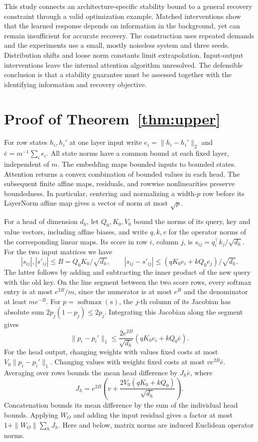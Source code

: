 \documentclass{article}
\DeclareMathOperator{\softmax}{softmax}
\newcommand{\norm}[1]{\lVert #1\rVert_2}
\begin{document}
This study connects an architecture-specific stability bound to a
general recovery constraint through a valid optimization example.
Matched interventions show that the learned response depends on
information in the background, yet can remain insufficient for
accurate recovery. The construction uses repeated demands and the
experiments use a small, mostly noiseless system and three seeds.
Distribution shifts and loose norm constants limit extrapolation.
Input-output interventions leave the internal attention algorithm
unresolved. The defensible conclusion is that a stability guarantee
must be assessed together with the identifying information and
recovery objective.

\clearpage


\clearpage
\appendix
\onecolumn

\section{Proof of Theorem~\ref{thm:upper}}
\label{app:encoder}
For row states \(h_i,h_i'\) at one layer input write
\(e_i=\norm{h_i-h_i'}\) and \(\bar e=m^{-1}\sum_i e_i\).
All state norms have a common bound at each fixed layer, independent
of \(m\). The embedding maps bounded inputs to bounded states.
Attention returns a convex combination of bounded values in each
head. The subsequent finite affine maps, residuals, and rowwise
nonlinearities preserve boundedness. In particular, centering and
normalizing a width-\(p\) row before its LayerNorm affine map gives
a vector of norm at most \(\sqrt p\).

For a head of dimension \(d_h\), let \(Q_0,K_0,V_0\) bound the norms
of its query, key and value vectors, including affine biases, and
write \(q,k,v\) for the operator norms of the corresponding linear
maps. Its score in row \(i\), column \(j\), is
\(s_{ij}=q_i^\top k_j/\sqrt{d_h}\). For the two input matrices we have
\[
 |s_{ij}|,|s'_{ij}|\le B=Q_0K_0/\sqrt{d_h},
 \qquad |s_{ij}-s'_{ij}|\le
 (qK_0e_i+kQ_0e_j)/\sqrt{d_h}.
\]
The latter follows by adding and subtracting the inner product of
the new query with the old key. On the line segment between the two
score rows, every softmax entry is at most \(e^{2B}/m\), since the
numerator is at most \(e^B\) and the denominator at least \(me^{-B}\).
For \(p=\softmax(s)\), the \(j\)-th column of its Jacobian has absolute
sum \(2p_j(1-p_j)\le2p_j\). Integrating this Jacobian along the segment
gives
\[
 \lVert p_i-p_i'\rVert_1
 \le \frac{2e^{2B}}{\sqrt{d_h}}(qK_0 e_i+kQ_0\bar e).
\]
For the head output, changing weights with values fixed costs at
most \(V_0\lVert p_i-p_i'\rVert_1\). Changing values with weights fixed
costs at most \(ve^{2B}\bar e\). Averaging over rows bounds the mean
head difference by \(J_h\bar e\), where
\[
 J_h=e^{2B}\left(v+\frac{2V_0(qK_0+kQ_0)}{\sqrt{d_h}}\right).
\]
Concatenation bounds its mean difference by the sum of the individual
head bounds. Applying \(W_O\) and adding the input residual gives a
factor at most \(1+\|W_O\|\sum_hJ_h\). Here and below, matrix norms
are induced Euclidean operator norms.
\end{document}
